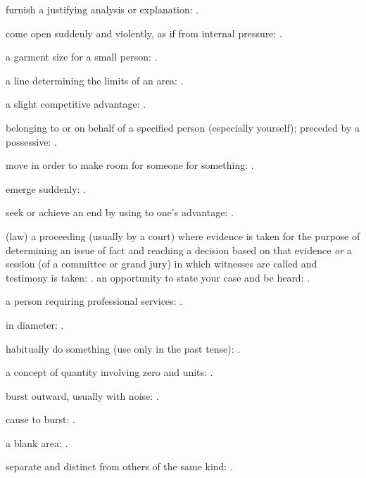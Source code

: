   furnish a justifying analysis or explanation:   .

  come open suddenly and violently, as if from internal pressure:   .

  a garment size for a small person: .

  a line determining the limits of an area:   .

  a slight competitive advantage: .

  belonging to or on behalf of a specified person (especially yourself); preceded by a possessive:   .

  move in order to make room for someone for something:   .

  emerge suddenly: .

  seek or achieve an end by using to one's advantage: .

  (law) a proceeding (usually by a court) where evidence is taken for the purpose of determining an issue of fact and reaching a decision based on that evidence \textit{or} a session (of a committee or grand jury) in which witnesses are called and testimony is taken: . an opportunity to state your case and be heard:   .

  a person requiring professional services: .

  in diameter: .

  habitually do something (use only in the past tense): .

  a concept of quantity involving zero and units: .

  burst outward, usually with noise:   .

  cause to burst:   .

  a blank area:   .

  separate and distinct from others of the same kind:   .

